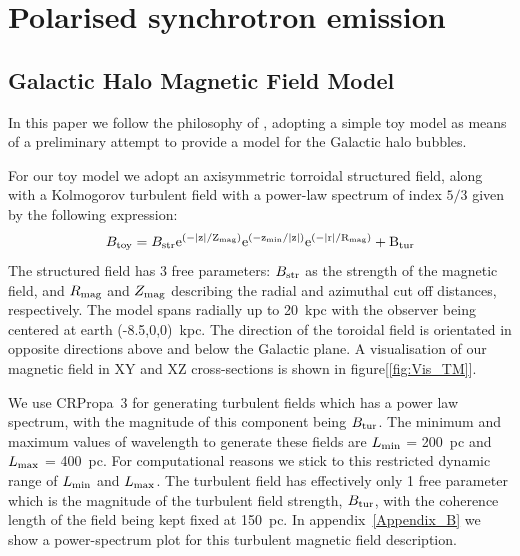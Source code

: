\documentclass[usenatbib]{mnras}
\begin{document}
\section{Polarised synchrotron emission}
\label{Methods}

\subsection{Galactic Halo Magnetic Field Model}
\label{GMF}
In this paper we follow the philosophy of \cite{West_Helicity}, adopting a simple toy model as means of a preliminary attempt to provide a model for the Galactic halo bubbles. 

For our toy model we adopt an axisymmetric torroidal structured field, along with a Kolmogorov turbulent field with a power-law spectrum of index $5/3$ given by the following expression:
\begin{equation}\label{TM_equation}
B_{\rm{toy}}= B_{\rm{str}}\rm{e}^{{(-|z|}/Z_{\rm{mag}})} \rm{e}^{(-z_{\rm{min}}/|z|)}\rm{e}^{(-|r|/R_{\rm{mag}})} + B_{\rm{tur}}
\end{equation}
The structured field has 3 free parameters: $B_{\rm str}$ as the strength of the magnetic field, and $R_{\rm {mag}}$ and $Z_{\rm {mag}}$ describing the radial and azimuthal cut off distances, respectively. The model spans radially up to 20~kpc with the observer being centered at earth (-8.5,0,0)~kpc. The direction of the toroidal field is orientated in opposite directions above and below the Galactic plane. A visualisation of our magnetic field in XY and XZ cross-sections is shown in figure[\ref{fig:Vis_TM}]. 

We use CRPropa~3 \cite{CRPropa3_2016} for generating turbulent fields which has a power law spectrum, with the magnitude of this component being $B_{\rm{tur}}$. 
The minimum and maximum values of wavelength to generate these fields are  $L_{\rm min}$ = 200~pc and $L_{\rm max}$ = 400~pc. For computational reasons we stick to this restricted dynamic range of $L_{\rm min}$ and $L_{\rm max}$. The turbulent field has effectively only 1 free parameter which is the magnitude of the turbulent field strength, $ B_{\rm tur}$, with the coherence length of the field being kept fixed at 150~pc.  In appendix~\ref{Appendix_B} we show a power-spectrum plot for this turbulent magnetic field description.
\end{document}
